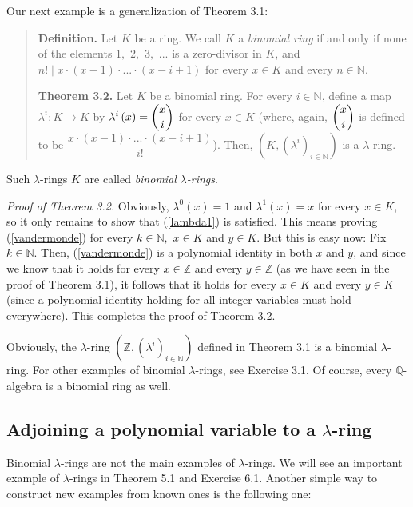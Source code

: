 \documentclass[numbers=enddot,12pt,final,onecolumn,notitlepage]{scrartcl}%
\begin{document}
Our next example is a generalization of Theorem 3.1:

\begin{quote}
\textbf{Definition.} Let $K$ be a ring. We call $K$ a \textit{binomial ring}
if and only if none of the elements $1,$ $2,$ $3,$ $...$ is a zero-divisor in
$K$, and $n!\mid x\cdot\left(  x-1\right)  \cdot...\cdot\left(  x-i+1\right)
$ for every $x\in K$ and every $n\in\mathbb{N}$.

\textbf{Theorem 3.2.} Let $K$ be a binomial ring. For every $i\in\mathbb{N}$,
define a map $\lambda^{i}:K\rightarrow K$ by $\lambda^{i}\left(  x\right)
=\dbinom{x}{i}$ for every $x\in K$ (where, again, $\dbinom{x}{i}$ is defined
to be $\dfrac{x\cdot\left(  x-1\right)  \cdot...\cdot\left(  x-i+1\right)
}{i!}$). Then, $\left(  K,\left(  \lambda^{i}\right)  _{i\in\mathbb{N}%
}\right)  $ is a $\lambda$-ring.
\end{quote}

Such $\lambda$-rings $K$ are called \textit{binomial }$\lambda$\textit{-rings}.

\textit{Proof of Theorem 3.2.} Obviously, $\lambda^{0}\left(  x\right)  =1$
and $\lambda^{1}\left(  x\right)  =x$ for every $x\in K$, so it only remains
to show that (\ref{lambda1}) is satisfied. This means proving
(\ref{vandermonde}) for every $k\in\mathbb{N},$ $x\in K$ and $y\in K$. But
this is easy now: Fix $k\in\mathbb{N}$. Then, (\ref{vandermonde}) is a
polynomial identity in both $x$ and $y$, and since we know that it holds for
every $x\in\mathbb{Z}$ and every $y\in\mathbb{Z}$ (as we have seen in the
proof of Theorem 3.1), it follows that it holds for every $x\in K$ and every
$y\in K$ (since a polynomial identity holding for all integer variables must
hold everywhere). This completes the proof of Theorem 3.2.

Obviously, the $\lambda$-ring $\left(  \mathbb{Z},\left(  \lambda^{i}\right)
_{i\in\mathbb{N}}\right)  $ defined in Theorem 3.1 is a binomial $\lambda
$-ring. For other examples of binomial $\lambda$-rings, see Exercise 3.1. Of
course, every $\mathbb{Q}$-algebra is a binomial ring as well.

\subsection{Adjoining a polynomial variable to a $\lambda$-ring}

Binomial $\lambda$-rings are not the main examples of $\lambda$-rings. We will
see an important example of $\lambda$-rings in Theorem 5.1 and Exercise 6.1.
Another simple way to construct new examples from known ones is the following one:
\end{document}
